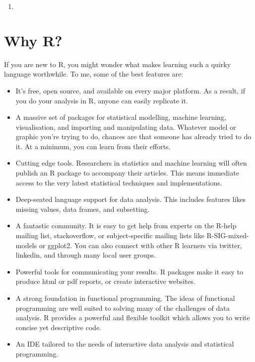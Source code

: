 \begin{enumerate}
\def\labelenumi{\arabic{enumi}.}
\item
\end{enumerate}

\section{Why R?}

If you are new to R, you might wonder what makes learning such a quirky
language worthwhile. To me, some of the best features are:

\begin{itemize}
\item
  It's free, open source, and available on every major platform. As a
  result, if you do your analysis in R, anyone can easily replicate it.
\item
  A massive set of packages for statistical modelling, machine learning,
  visualisation, and importing and manipulating data. Whatever model or
  graphic you're trying to do, chances are that someone has already
  tried to do it. At a minimum, you can learn from their efforts.
\item
  Cutting edge tools. Researchers in statistics and machine learning
  will often publish an R package to accompany their articles. This
  means immediate access to the very latest statistical techniques and
  implementations.
\item
  Deep-seated language support for data analysis. This includes features
  likes missing values, data frames, and subsetting.
\item
  A fantastic community. It is easy to get help from experts on the
  R-help mailing list, stackoverflow, or subject-specific mailing lists
  like R-SIG-mixed-models or ggplot2. You can also connect with other R
  learners via twitter, linkedin, and through many local user groups.
\item
  Powerful tools for communicating your results. R packages make it easy
  to produce html or pdf reports, or create interactive websites.
\item
  A strong foundation in functional programming. The ideas of functional
  programming are well suited to solving many of the challenges of data
  analysis. R provides a powerful and flexible toolkit which allows you
  to write concise yet descriptive code.
\item
  An IDE tailored to the needs of interactive data analysis and
  statistical programming.
\end{itemize}

